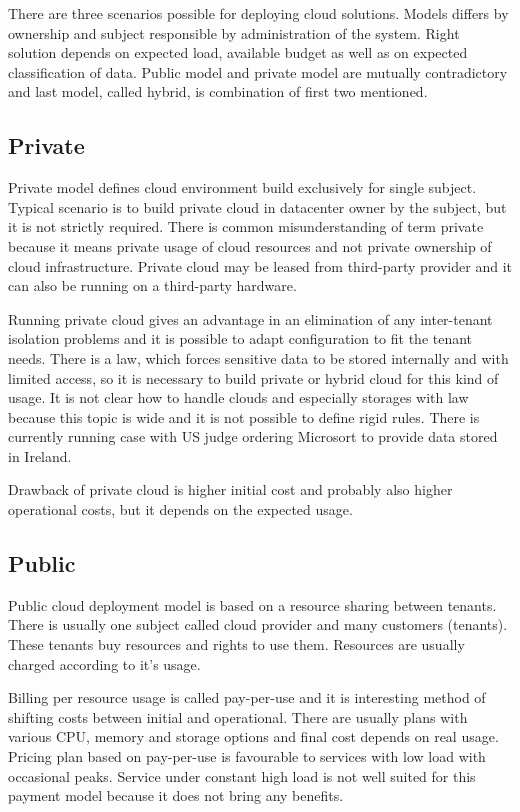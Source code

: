 
There are three scenarios possible for deploying cloud solutions. Models differs by ownership and subject responsible by administration of the system. Right solution depends on expected load, available budget as well as on expected classification of data. Public model and private model are mutually contradictory and last model, called hybrid, is combination of first two mentioned.

\subsection{Private}
Private model defines cloud environment build exclusively for single subject. Typical scenario is to build private cloud in datacenter owner by the subject, but it is not strictly required. There is common misunderstanding of term private because it means private usage of cloud resources and not private ownership of cloud infrastructure. Private cloud may be leased from third-party provider and it can also be running on a third-party hardware.

Running private cloud gives an advantage in an elimination of any inter-tenant isolation problems and it is possible to adapt configuration to fit the tenant needs. There is a law, which forces sensitive data to be stored internally and with limited access, so it is necessary to build private or hybrid cloud for this kind of usage. It is not clear how to handle clouds and especially storages with law because this topic is wide and it is not possible to define rigid rules. There is currently running case with \Ac{US} judge ordering Microsort to provide data stored in Ireland. \cite{wp-microsoft-ireland}

Drawback of private cloud is higher initial cost and probably also higher operational costs, but it depends on the expected usage.

\subsection{Public}
Public cloud deployment model is based on a resource sharing between tenants. There is usually one subject called cloud provider and many customers (tenants). These tenants buy resources and rights to use them. Resources are usually charged according to it's usage.

Billing per resource usage is called pay-per-use and it is interesting method of shifting costs between initial and operational. There are usually plans with various \Ac{CPU}, memory and storage options and final cost depends on real usage. Pricing plan based on pay-per-use is favourable to services with low load with occasional peaks. Service under constant high load is not well suited for this payment model because it does not bring any benefits.

